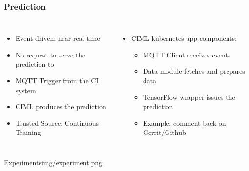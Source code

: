\documentclass[aspectratio=169,11pt,hyperref={colorlinks=true}]{beamer}
\begin{document}
\begin{frame}
    \frametitle{Prediction}
    \begin{columns}
        \begin{itemize}
            \item{Event driven: near real time}
            \item{No request to serve the prediction to}
            \item{MQTT Trigger from the CI system}
            \item{CIML produces the prediction}
            \item{Trusted Source: Continuous Training}
        \end{itemize}
        \begin{itemize}
          \item{CIML kubernetes app components:}
          \begin{itemize}
            \item{MQTT Client receives events}
            \item{Data module fetches and prepares data}
            \item{TensorFlow wrapper issues the prediction}
            \item{Example: comment back on Gerrit/Github}
          \end{itemize}
        \end{itemize}
    \end{columns}
\end{frame}

\begin{sectionpic}
{Experiments}{img/experiment.png}
\end{sectionpic}
\end{document}
